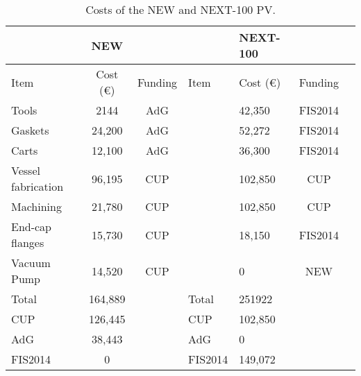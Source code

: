 \begin{table}[h!]
\begin{center}
\begin{tabular}{|l|c|c||l|l|c|c|}
\hline
&{\bf NEW}	& & & {\bf NEXT-100} &  \\
\hline	
 Item & Cost (\euro) & Funding &  Item & Cost (\euro) & Funding   \\
\hline
Tools 	& 2144 &	AdG	& &	42,350 &	FIS2014\\
Gaskets	& 24,200	&AdG & & 		52,272 &	FIS2014\\
Carts	& 12,100	& AdG &&	36,300 &	FIS2014 \\
Vessel fabrication &	96,195 &	CUP & &		102,850 & 	CUP \\
Machining &	21,780 &	CUP & &		102,850 & 	CUP \\
End-cap flanges &	15,730 &	CUP	& &	18,150 &	FIS2014 \\
Vacuum Pump	& 14,520 & 	CUP & &		0 &	NEW \\
\hline
Total	& 164,889 & & 	Total &	251922 & \\	
CUP	& 126,445	&&	CUP	& 102,850	 & \\
AdG	& 38,443 & &		AdG &	0  &\\
FIS2014	& 0 & &		FIS2014 &	149,072  &\\		
\hline\hline
\end{tabular}  
\caption{Costs of the NEW and NEXT-100 PV. }
\label{tab:PV}
\end{center}
\end{table} 

%
